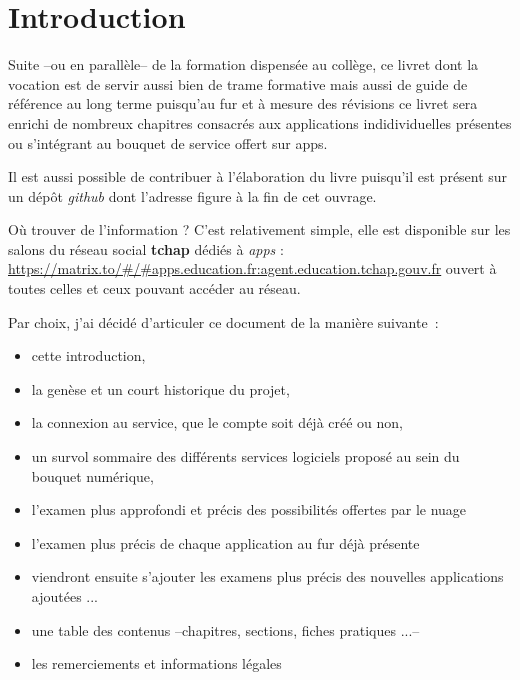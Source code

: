 \chapter{Introduction}

Suite --ou en parallèle-- de la formation dispensée au collège, ce livret dont la vocation est de servir aussi bien de trame formative mais aussi de guide de référence au long terme puisqu'au fur et à mesure des révisions ce livret sera enrichi de nombreux chapitres consacrés aux applications indidividuelles présentes ou s'intégrant au bouquet de service offert sur apps.

Il est aussi possible de contribuer à l'élaboration du livre puisqu'il est présent sur un dépôt \emph{github} dont l'adresse figure à la fin de cet ouvrage. 

Où trouver de l'information ? C'est relativement simple, elle est disponible sur les salons du réseau social \textbf{tchap} dédiés à \emph{apps} : \url{https://matrix.to/#/#apps.education.fr:agent.education.tchap.gouv.fr} ouvert à toutes celles et ceux pouvant accéder au réseau.

Par choix, j'ai décidé d'articuler ce document de la manière suivante~:
\begin{itemize}
	\item cette introduction,
	\item la genèse et un court historique du projet,
	\item la connexion au service, que le compte soit déjà créé ou non,
	\item un survol sommaire des différents services logiciels proposé au sein du bouquet numérique,
	\item l'examen plus approfondi et précis des possibilités offertes par le nuage
	\item l'examen plus précis de chaque application au fur déjà présente
	\item viendront ensuite s'ajouter les examens plus précis des nouvelles applications ajoutées ...
	\item une table des contenus --chapitres, sections, fiches pratiques ...-- 
	\item les remerciements et informations légales
\end{itemize}

